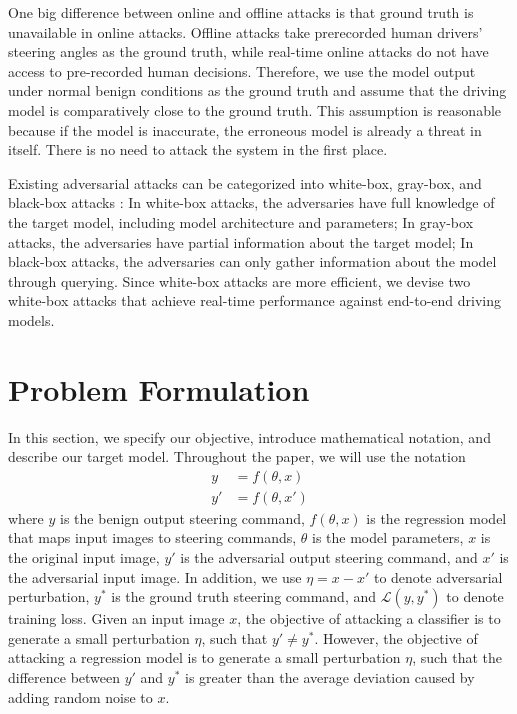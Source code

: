 One big difference between online and offline attacks is that ground truth is unavailable in online attacks. Offline attacks take prerecorded human drivers' steering angles as the ground truth, while real-time online attacks do not have access to pre-recorded human decisions. Therefore, we use the model output under normal benign conditions as the ground truth and assume that the driving model is comparatively close to the ground truth. This assumption is reasonable because if the model is inaccurate, the erroneous model is already a threat in itself. There is no need to attack the system in the first place.

Existing adversarial attacks can be categorized into white-box, gray-box, and black-box attacks \citep{REN2020346}: In white-box attacks, the adversaries have full knowledge of the target model, including model architecture and parameters; In gray-box attacks, the adversaries have partial information about the target model; In black-box attacks, the adversaries can only gather information about the model through querying. Since white-box attacks are more efficient, we devise two white-box attacks that achieve real-time performance against end-to-end driving models.


\section{Problem Formulation}
\label{section_problem_formulation}

In this section, we specify our objective, introduce mathematical notation, and describe our target model. Throughout the paper, we will use the notation
\begin{align}
y&=f(\theta, x) \\
y'&=f(\theta, x')
\end{align}
where $y$ is the benign output steering command, $f(\theta, x)$ is the regression model that maps input images to steering commands, $\theta$ is the model parameters, $x$ is the original input image, $y'$ is the adversarial output steering command, and $x'$ is the adversarial input image. In addition, we use $\eta=x-x'$ to denote adversarial perturbation, $y^{*}$ is the ground truth steering command, and $\mathcal{L}(y, y^{*})$ to denote training loss. Given an input image $x$, the objective of attacking a classifier is to generate a small perturbation $\eta$, such that $y' \neq y^{*}$. However, the objective of attacking a regression model is to generate a small perturbation $\eta$, such that the difference between $y'$ and $y^{*}$ is greater than the average deviation caused by adding random noise to $x$.

